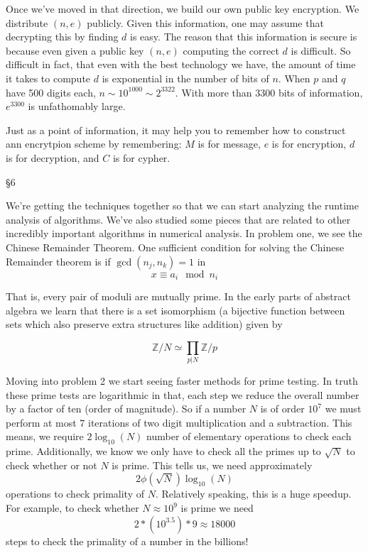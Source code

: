 \documentclass[16 pt]{amsart}
\theoremstyle{definition}
\theoremstyle{remark}
\numberwithin{equation}{subsection}
\newcommand{\Z}{\mathbb{Z}}
\begin{document}
\par  Once we've moved in that direction, we build our own public key encryption. We distribute $(n,e)$ publicly.   Given this information, one may assume that decrypting this by finding $d$ is easy.  The reason that this information is secure is because even given a public key $(n,e)$ computing the correct $d$ is difficult.  So difficult in fact, that even with the best technology we have, the amount of time it takes to compute $d$ is exponential in the number of bits of $n$.  When $p$ and $q$ have 500 digits each, $n\sim 10^{1000} \sim 2^{3322}$.  With more than 3300 bits of information, $e^{3300}$ is unfathomably large.\\ 


\par Just as a point of information, it may help you to remember how to construct ann encrytpion scheme by remembering: $M$ is for message, $e$ is for encryption, $d$ is for decryption, and $C$ is for cypher.


\S6

We're getting the techniques together so that we can start analyzing the runtime analysis of algorithms.  We've also studied some pieces that are related to other incredibly important algorithms in numerical analysis.  In problem one, we see the Chinese Remainder Theorem.  One sufficient condition for solving the Chinese Remainder theorem is if $\gcd(n_j,n_k)=1$ in
\[
x \equiv a_i \mod n_i
\]

That is, every pair of moduli are mutually prime.  In the early parts of abstract algebra we learn that there is a set isomorphism (a bijective function between sets which also preserve extra structures like addition) given by

\[
\Z /N \simeq \prod_{p|N} \Z/p
\]

Moving into problem 2 we start seeing faster methods for prime testing.  In truth these prime tests are logarithmic in that, each step we reduce the overall number by a factor of ten (order of magnitude).  So if a number $N$ is of order $10^7$ we must perform at most 7 iterations of two digit multiplication and a subtraction.  This means, we require $2\log_{10}(N)$ number of elementary operations to check each prime.  Additionally, we know we only have to check all the primes up to $\sqrt{N}$ to check whether or not $N$ is prime.  This tells us, we need approximately
\[
2\phi(\sqrt{N}) \log_{10}(N)
\]
operations to check primality of $N$.  Relatively speaking, this is a huge speedup.  For example, to check whether $N\approx 10^9$ is prime we need
\[
2*(10^{3.5})*9 \approx 18000
\]
steps to check the primality of a number in the billions!
\end{document}
